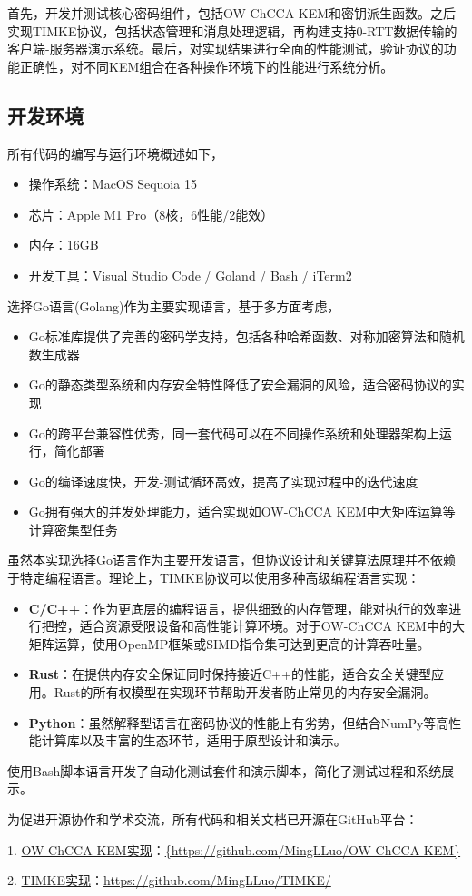 首先，开发并测试核心密码组件，包括OW-ChCCA KEM和密钥派生函数。之后实现TIMKE协议，包括状态管理和消息处理逻辑，再构建支持0-RTT数据传输的客户端-服务器演示系统。最后，对实现结果进行全面的性能测试，验证协议的功能正确性，对不同KEM组合在各种操作环境下的性能进行系统分析。

\subsection{开发环境}
所有代码的编写与运行环境概述如下，
\begin{itemize}
  \item 操作系统：MacOS Sequoia 15
  \item 芯片：Apple M1 Pro（8核，6性能/2能效）
  \item 内存：16GB
  \item 开发工具：Visual Studio Code / Goland / Bash / iTerm2
\end{itemize}

选择Go语言(Golang)作为主要实现语言，基于多方面考虑，
\begin{itemize}
  \item Go标准库提供了完善的密码学支持，包括各种哈希函数、对称加密算法和随机数生成器
  \item Go的静态类型系统和内存安全特性降低了安全漏洞的风险，适合密码协议的实现
  \item Go的跨平台兼容性优秀，同一套代码可以在不同操作系统和处理器架构上运行，简化部署
  \item Go的编译速度快，开发-测试循环高效，提高了实现过程中的迭代速度
  \item Go拥有强大的并发处理能力，适合实现如OW-ChCCA KEM中大矩阵运算等计算密集型任务
\end{itemize}

虽然本实现选择Go语言作为主要开发语言，但协议设计和关键算法原理并不依赖于特定编程语言。理论上，TIMKE协议可以使用多种高级编程语言实现：

\begin{itemize}
  \item \textbf{C/C++}：作为更底层的编程语言，提供细致的内存管理，能对执行的效率进行把控，适合资源受限设备和高性能计算环境。对于OW-ChCCA KEM中的大矩阵运算，使用OpenMP框架或SIMD指令集可达到更高的计算吞吐量。
  
  \item \textbf{Rust}：在提供内存安全保证同时保持接近C++的性能，适合安全关键型应用。Rust的所有权模型在实现环节帮助开发者防止常见的内存安全漏洞。
  
  \item \textbf{Python}：虽然解释型语言在密码协议的性能上有劣势，但结合NumPy等高性能计算库以及丰富的生态环节，适用于原型设计和演示。
\end{itemize}

使用Bash脚本语言开发了自动化测试套件和演示脚本，简化了测试过程和系统展示。

为促进开源协作和学术交流，所有代码和相关文档已开源在GitHub平台：

1. \href{https://github.com/MingLLuo/OW-ChCCA-KEM}{OW-ChCCA-KEM实现}：\url{{https://github.com/MingLLuo/OW-ChCCA-KEM}}

2. \href{https://github.com/MingLLuo/TIMKE/}{TIMKE实现}：\url{https://github.com/MingLLuo/TIMKE/}